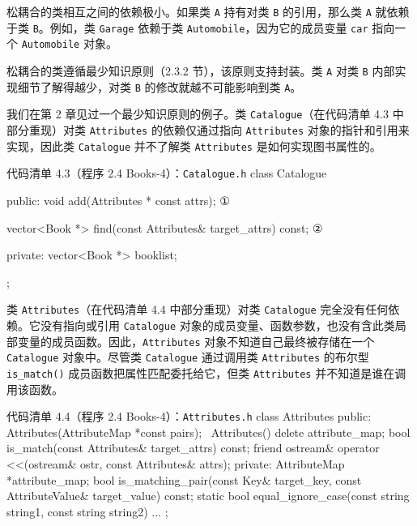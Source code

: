 松耦合的类相互之间的依赖极小。如果类 \texttt{A} 持有对类 \texttt{B} 的引用，那么类 \texttt{A} 就依赖于类 \texttt{B}。例如，类 \texttt{Garage} 依赖于类 \texttt{Automobile}，因为它的成员变量 \texttt{car} 指向一个 \texttt{Automobile} 对象。

松耦合的类遵循最少知识原则（2.3.2 节），该原则支持封装。类 \texttt{A} 对类 \texttt{B} 内部实现细节了解得越少，对类 \texttt{B} 的修改就越不可能影响到类 \texttt{A}。


我们在第 2 章见过一个最少知识原则的例子。类 \texttt{Catalogue}（在代码清单 4.3 中部分重现）对类 \texttt{Attributes} 的依赖仅通过指向 \texttt{Attributes} 对象的指针和引用来实现，因此类 \texttt{Catalogue} 并不了解类 \texttt{Attributes} 是如何实现图书属性的。

\begin{codeboxt}{代码清单 4.3（程序 2.4 Books-4）：\texttt{Catalogue.\allowbreak{}h}}
class Catalogue
{
public:
    void add(Attributes * const attrs);                            ①

    vector<Book *> find(const Attributes& target_attrs) const;     ②

private:
    vector<Book *> booklist;
};
\end{codeboxt}
\par
{}\par

类 \texttt{Attributes}（在代码清单 4.4 中部分重现）对类 \texttt{Catalogue} 完全没有任何依赖。它没有指向或引用 \texttt{Catalogue} 对象的成员变量、函数参数，也没有含此类局部变量的成员函数。因此，\texttt{Attributes} 对象不知道自己最终被存储在一个 \texttt{Catalogue} 对象中。尽管类 \texttt{Catalogue} 通过调用类 \texttt{Attributes} 的布尔型 \texttt{is\_\allowbreak{}match(\allowbreak{})\allowbreak{}} 成员函数把属性匹配委托给它，但类 \texttt{Attributes} 并不知道是谁在调用该函数。

\begin{codeboxt}{代码清单 4.4（程序 2.4 Books-4）：\texttt{Attributes.\allowbreak{}h}}
class Attributes
{
public:
    Attributes(AttributeMap *const pairs);
    ~Attributes() { delete attribute_map; }
    bool is_match(const Attributes& target_attrs) const;
    friend ostream& operator <<(ostream& ostr,
                                const Attributes& attrs);
private:
    AttributeMap *attribute_map;
    bool is_matching_pair(const Key& target_key,
                          const AttributeValue& target_value) const;
    static bool equal_ignore_case(const string string1,
                                  const string string2) ...
};
\end{codeboxt}

